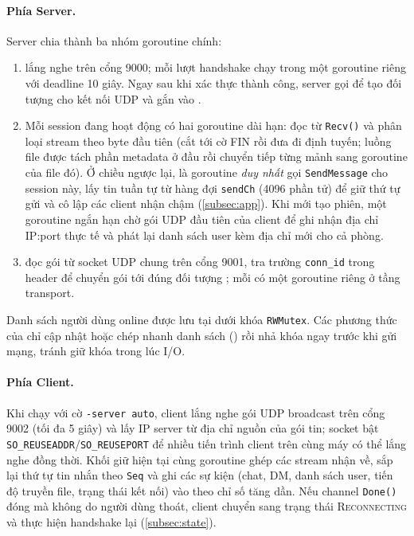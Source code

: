 \paragraph{Phía Server.} Server chia thành ba nhóm goroutine chính:
\begin{enumerate}[label=(\arabic*), leftmargin=*, itemsep=2pt]
  \item {} lắng nghe trên cổng 9000; mỗi lượt handshake chạy trong một goroutine riêng với deadline
        10 giây. Ngay sau khi xác thực thành công, server gọi  để tạo
        đối tượng  cho kết nối UDP và gắn vào .
  \item Mỗi session đang hoạt động có hai goroutine dài hạn:  đọc từ \texttt{Recv()} và phân
        loại stream theo byte đầu tiên (cắt tới cờ FIN rồi đưa đi định tuyến; luồng file được
        tách phần metadata ở đầu rồi chuyển tiếp từng mảnh sang goroutine  của file đó). Ở chiều
        ngược lại,  là goroutine \emph{duy nhất} gọi \texttt{SendMessage} cho session này, lấy tin
        tuần tự từ hàng đợi \texttt{sendCh} (4096 phần tử) để giữ thứ tự gửi và cô lập các client nhận chậm
        (\cref{subsec:app}). Khi mới tạo phiên, một goroutine ngắn hạn  chờ gói UDP đầu tiên của
        client để ghi nhận địa chỉ IP:port thực tế và phát lại danh sách user kèm địa chỉ mới cho cả phòng.
  \item {} đọc gói từ socket UDP chung trên cổng 9001, tra trường \texttt{conn\_id} trong header
        để chuyển gói tới đúng đối tượng ; mỗi  có một goroutine  riêng ở tầng
        transport.
\end{enumerate}
Danh sách người dùng online được lưu tại  dưới khóa \texttt{RWMutex}. Các phương thức của
 chỉ cập nhật hoặc chép nhanh danh sách () rồi nhả khóa ngay trước khi gửi mạng,
tránh giữ khóa trong lúc I/O.

\paragraph{Phía Client.} Khi chạy với cờ \texttt{-server auto}, client lắng nghe gói UDP broadcast trên cổng 9002
(tối đa 5 giây) và lấy IP server từ địa chỉ nguồn của gói tin; socket bật \texttt{SO\_REUSEADDR}/\texttt{SO\_REUSEPORT}
để nhiều tiến trình client trên cùng máy có thể lắng nghe đồng thời. Khối  giữ 
hiện tại cùng goroutine  ghép các stream nhận về, sắp lại thứ tự tin nhắn theo \texttt{Seq} và
ghi các sự kiện (chat, DM, danh sách user, tiến độ truyền file, trạng thái kết nối) vào  theo chỉ
số tăng dần. Nếu channel \texttt{Done()} đóng mà không do người dùng thoát, client chuyển sang trạng thái
\textsc{Reconnecting} và thực hiện handshake lại (\cref{subsec:state}).

